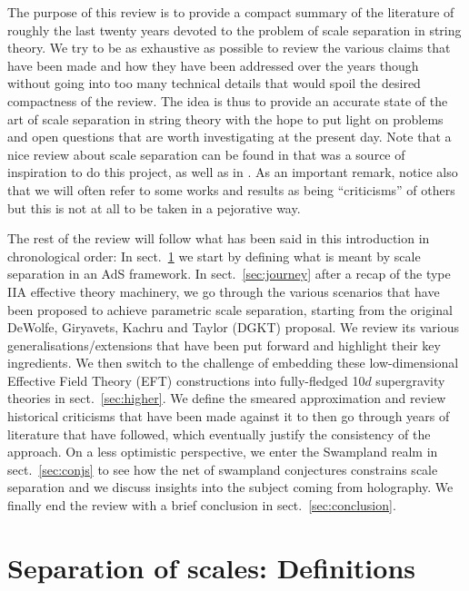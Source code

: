 \documentclass[11pt, a4paper]{article}
\begin{document}
The purpose of this review is to provide a compact summary of the literature of roughly the last twenty years devoted to the problem of scale separation in string theory. We try to be as exhaustive as possible to review the various claims that have been made and how they have been addressed over the years though without going into too many technical details that would spoil the desired compactness of the review. The idea is thus to provide an accurate state of the art of scale separation in string theory with the hope to put light on problems and open questions that are worth investigating at the present day. Note that a nice review about scale separation can be found in \cite{talkVR} that was a source of inspiration to do this project, as well as in \cite{VanRiet:2023pnx}. As an important remark, notice also that we will often refer to some works and results as being ``criticisms'' of others but this is not at all to be taken in a pejorative way.

The rest of the review will follow what has been said in this introduction in chronological order: In sect.~\ref{sec:def} we start by defining what is meant by scale separation in an AdS framework. In sect.~\ref{sec:journey} after a recap of the type IIA effective theory machinery, we go through the various scenarios that have been proposed to achieve parametric scale separation, starting from the original DeWolfe, Giryavets, Kachru and Taylor (DGKT) proposal. We review its various generalisations/extensions that have been put forward and highlight their key ingredients. We then switch to the challenge of embedding these low-dimensional Effective Field Theory (EFT) constructions into fully-fledged 10$d$ supergravity theories in sect.~\ref{sec:higher}. We define the smeared approximation and review historical criticisms that have been made against it to then go through years of literature that have followed, which eventually justify the consistency of the approach. On a less optimistic perspective, we enter the Swampland realm in sect.~\ref{sec:conjs} to see how the net of swampland conjectures constrains scale separation and we discuss insights into the subject coming from holography. We finally end the review with a brief conclusion in sect.~\ref{sec:conclusion}.

\section{Separation of scales: Definitions}
\label{sec:def}
\end{document}
